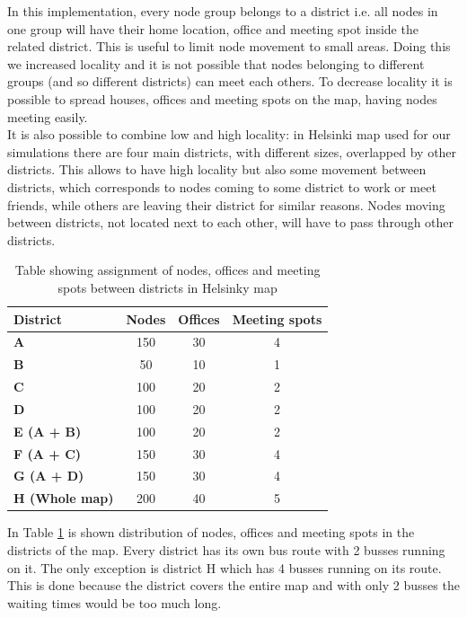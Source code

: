 In this implementation, every node group belongs to a district i.e. all nodes in one group will have their home location, office and meeting spot inside the related district. This is useful to limit node movement to small areas. Doing this we increased locality and it is not possible that nodes belonging to different groups (and so different districts) can meet each others. To decrease locality it is possible to spread houses, offices and meeting spots on the map, having nodes meeting easily.
\\

It is also possible to combine low and high locality: in Helsinki map used for our simulations there are four main districts, with different sizes, overlapped by other districts. This allows to have high locality but also some movement between districts, which corresponds to nodes coming to some district to work or meet friends, while others are leaving their district for similar reasons. Nodes moving between districts, not located next to each other, will have to pass through other districts. 
\\

\begin{table}[h]
\begin{center}
\begin{tabular}{|l|c|c|c|}
\hline
\textbf{District} & \textbf{Nodes} & \textbf{Offices} & \textbf{Meeting spots}\\
\hline
\hline
\bfseries A & 150 & 30 & 4 \\
\hline
\bfseries B & 50 & 10 & 1 \\
\hline
\bfseries C & 100 & 20 & 2 \\
\hline
\bfseries D & 100 & 20 & 2 \\
\hline
\bfseries E (A + B) & 100 & 20 & 2 \\
\hline
\bfseries F (A + C) & 150 & 30 & 4 \\
\hline
\bfseries G (A + D) & 150 & 30 & 4 \\
\hline
\bfseries H (Whole map) & 200 & 40 & 5 \\
\hline
\end{tabular}
\end{center}
\caption[Helsinky map districts]{Table showing assignment of nodes, offices and meeting spots between districts in Helsinky map}    
\label{tabellaDistrettiMappa}
\end{table}

In Table \ref{tabellaDistrettiMappa} is shown distribution of nodes, offices and meeting spots in the districts of the map. Every district has its own bus route with 2 busses running on it. The only exception is district H which has 4 busses running on its route. This is done because the district covers the entire map and with only 2 busses the waiting times would be too much long.

